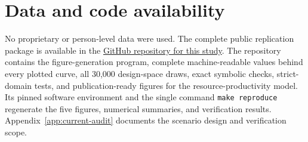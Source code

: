 \section*{Data and code availability}
No proprietary or person-level data were used. The complete public replication package is available in the \href{https://github.com/yqdiao/drone-corridor-capacity-reproducibility}{GitHub repository for this study}. The repository contains the figure-generation program, complete machine-readable values behind every plotted curve, all 30,000 design-space draws, exact symbolic checks, strict-domain tests, and publication-ready figures for the resource-productivity model. Its pinned software environment and the single command \texttt{make reproduce} regenerate the five figures, numerical summaries, and verification results. Appendix~\ref{app:current-audit} documents the scenario design and verification scope.
